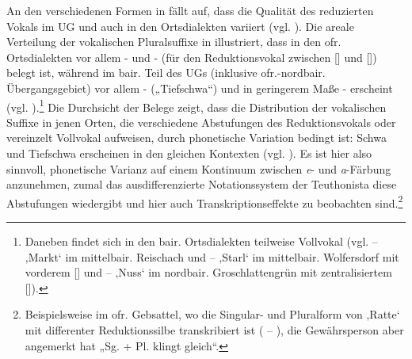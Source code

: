An den verschiedenen Formen in 	 fällt auf, dass die Qualität des reduzierten Vokals im UG und auch in den Ortsdialekten variiert (vgl. \citealt[387]{Schirmunski1962}). Die areale Verteilung der vokalischen Pluralsuffixe in  illustriert, dass in den ofr. Ortsdialekten vor allem -\textit{} und -\textit{} (für den Reduktionsvokal zwischen [] und []) belegt ist, während im bair. Teil des UGs (inklusive ofr.-nordbair. Übergangsgebiet) vor allem -\textit{} („Tiefschwa“) und in geringerem Maße -\textit{} erscheint (vgl. \citealt[6]{Mausser1915}).\footnote{Daneben findet sich in den bair. Ortsdialekten teilweise Vollvokal (vgl.  --  ‚Markt‘ im mittelbair. Reischach und  --  ‚Starl‘ im mittelbair. Wolfersdorf mit vorderem [] und  --  ‚Nuss‘ im nordbair. Groschlattengrün mit zentralisiertem []).}  Die Durchsicht der Belege zeigt, dass die Distribution der vokalischen Suffixe in jenen Orten, die verschiedene Abstufungen des Reduktionsvokals oder vereinzelt Vollvokal aufweisen, durch phonetische Variation bedingt ist: Schwa und Tiefschwa erscheinen in den gleichen Kontexten (vgl. \citealt[15]{Köhler1934}). Es ist hier also sinnvoll, phonetische Varianz auf einem Kontinuum zwischen \textit{e}{}- und \textit{a}{}-Färbung anzunehmen, zumal das ausdifferenzierte Notationssystem der Teuthonista diese Abstufungen wiedergibt und hier auch Transkriptionseffekte zu beobachten sind.\footnote{Beispielsweise im ofr. Gebsattel, wo die Singular- und Pluralform von ‚Ratte‘ mit differenter Reduktionssilbe transkribiert ist ( -- ), die Gewährsperson aber angemerkt hat „Sg. + Pl. klingt gleich“.}


